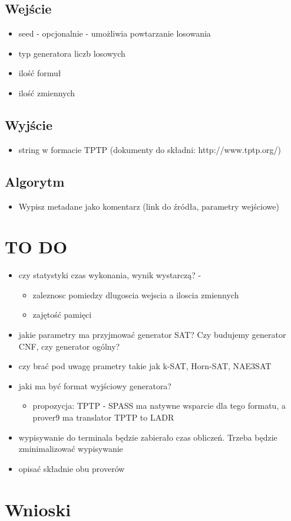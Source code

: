 \documentclass[a4paper,12pt]{article}
\begin{document}
\subsection{Wejście}

\begin{itemize}
  \item seed - opcjonalnie - umożliwia powtarzanie losowania
  \item typ generatora liczb losowych
  \item ilość formuł
  \item ilość zmiennych
\end{itemize}

\subsection{Wyjście}

\begin{itemize}
  \item string w formacie TPTP (dokumenty do składni: http://www.tptp.org/)
\end{itemize}

\subsection{Algorytm}
\begin{itemize}
  \item Wypisz metadane jako komentarz (link do źródła, parametry wejściowe)
\end{itemize}

\newpage
\section{TO DO}
\begin{itemize}
  \item czy statystyki czas wykonania, wynik wystarczą? -
    \begin{itemize}
      \item zaleznosc pomiedzy dlugoscia wejscia a iloscia zmiennych
      \item zajętość pamięci
    \end{itemize}

  \item jakie parametry ma przyjmować generator SAT? Czy budujemy generator CNF, czy generator ogólny?
  \item  czy brać pod uwagę prametry takie jak
    k-SAT, Horn-SAT, NAE3SAT

  \item jaki ma być format wyjściowy generatora?
    \begin{itemize}
      \item propozycja: TPTP - SPASS ma natywne wsparcie dla tego formatu, a prover9 ma translator TPTP to LADR
    \end{itemize}

  \item wypisywanie do terminala będzie zabierało czas obliczeń. Trzeba będzie zminimalizować wypisywanie
  \item opisać składnie obu proverów

\end{itemize}

\newpage

\newpage
\section{Wnioski}
\lipsum[1]

\printglossary
\end{document}
